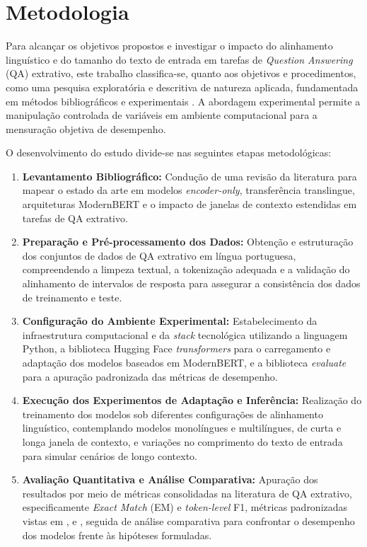 \documentclass[12pt,a4paper]{article}
\begin{document}
\section{Metodologia}

Para alcançar os objetivos propostos e investigar o impacto do alinhamento linguístico e do tamanho do texto de entrada em tarefas de \textit{Question Answering} (QA) extrativo, este trabalho classifica-se, quanto aos objetivos e procedimentos, como uma pesquisa exploratória e descritiva de natureza aplicada, fundamentada em métodos bibliográficos e experimentais \cite{gil2002como}. A abordagem experimental permite a manipulação controlada de variáveis em ambiente computacional para a mensuração objetiva de desempenho.

O desenvolvimento do estudo divide-se nas seguintes etapas metodológicas:

\begin{enumerate}
    \item \textbf{Levantamento Bibliográfico:} Condução de uma revisão da literatura para mapear o estado da arte em modelos \textit{encoder-only}, transferência translingue, arquiteturas ModernBERT e o impacto de janelas de contexto estendidas em tarefas de QA extrativo.
    \item \textbf{Preparação e Pré-processamento dos Dados:} Obtenção e estruturação dos conjuntos de dados de QA extrativo em língua portuguesa, compreendendo a limpeza textual, a tokenização adequada e a validação do alinhamento de intervalos de resposta para assegurar a consistência dos dados de treinamento e teste.
    \item \textbf{Configuração do Ambiente Experimental:} Estabelecimento da infraestrutura computacional e da \textit{stack} tecnológica utilizando a linguagem Python, a biblioteca Hugging Face \textit{transformers} para o carregamento e adaptação dos modelos baseados em ModernBERT, e a biblioteca \textit{evaluate} para a apuração padronizada das métricas de desempenho.
    \item \textbf{Execução dos Experimentos de Adaptação e Inferência:} Realização do treinamento dos modelos sob diferentes configurações de alinhamento linguístico, contemplando modelos monolíngues e multilíngues, de curta e longa janela de contexto, e variações no comprimento do texto de entrada para simular cenários de longo contexto.
\item \textbf{Avaliação Quantitativa e Análise Comparativa:} Apuração dos resultados por meio de métricas consolidadas na literatura de QA extrativo, especificamente \textit{Exact Match} (EM) e \textit{token-level} F1, métricas padronizadas vistas em \cite{deshpande}, \cite{le} e \cite{savant}, seguida de análise comparativa para confrontar o desempenho dos modelos frente às hipóteses formuladas.
\end{enumerate}
\end{document}
